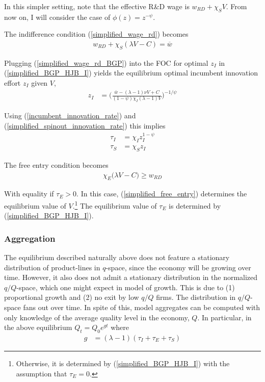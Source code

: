 \documentclass[12pt,english]{article}
\theoremstyle{remark}
\begin{document}
In this simpler setting, note that the effective R\&D wage is $w_{RD} + \chi_S V$. From now on, I will consider the case of $\phi(z) = z^{-\psi}$. 

The indifference condition (\ref{simplified_wage_rd}) becomes 
\begin{align}
	w_{RD} + \chi_S (\lambda V - C) = \overline{w} \label{simplified_wage_rd_BGP}
\end{align}

Plugging (\ref{simplified_wage_rd_BGP}) into the FOC for optimal $z_I$ in (\ref{simplified_BGP_HJB_I}) yields the equilibrium optimal incumbent innovation effort $z_I$ given $V$, 
\begin{align*}
	z_I &= \Big(  \frac{\bar{w}-(\lambda-1)\nu V + C}{(1-\psi)\chi_I(\lambda-1)V} \Big)^{-1/\psi}	
\end{align*}

Using (\ref{incumbent_innovation_rate}) and (\ref{simplified_spinout_innovation_rate}) this implies
\begin{align*}
	\tau_I &= \chi_I z_I^{1-\psi} \\
	\tau_S &= \chi_S z_I
\end{align*}

The free entry condition becomes
\begin{align}
	\chi_E \Big( \lambda V -  C \Big) \ge w_{RD} \label{simplified_free_entry}
\end{align}

With equality if $\tau_E > 0$. In this case, (\ref{simplified_free_entry}) determines the equilibrium value of $V$.\footnote{Otherwise, it is determined by (\ref{simplified_BGP_HJB_I}) with the assumption that $\tau_E = 0$.} The equilibrium value of $\tau_E$ is determined by (\ref{simplified_BGP_HJB_I}).

\subsubsection{Aggregation}

The equilibrium described naturally above does not feature a stationary distribution of product-lines in $q$-space, since the economy will be growing over time. However, it also does not admit a stationary distribution in the normalized $q/Q$-space, which one might expect in model of growth. This is due to (1) proportional growth and (2) no exit by low $q/Q$ firms. The distribution in $q/Q$-space fans out over time. In spite of this, model aggregates can be computed with only knowledge of the average quality level in the economy, $Q$. In particular, in the above equilibrium $Q_t = Q_0 e^{gt}$ where 
\begin{align}
	g &= (\lambda -1) (\tau_I + \tau_E + \tau_S) \label{simplified_growth_aggregation}
\end{align} 
\end{document}
